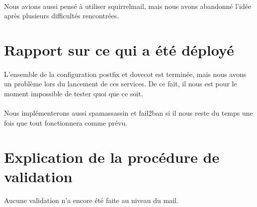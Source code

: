 \documentclass[a4paper,12pt]{article}
\begin{document}
	\paragraph{} Nous avions aussi pensé à utiliser squirrelmail, mais nous avons abandonné l'idée après plusieurs difficultés rencontrées.
		
\section{Rapport sur ce qui a été déployé}
	\paragraph{} L'ensemble de la configuration postfix et dovecot est terminée, mais nous avons un problème lors du lancement de ces services. De ce fait, il nous est pour le moment impossible de tester quoi que ce soit. 
	\paragraph{} Nous implémenterons aussi spamassassin et fail2ban si il nous reste du temps une fois que tout fonctionnera comme prévu.
	
\section{Explication de la procédure de validation}
	\paragraph{} Aucune validation n'a encore été faite au niveau du mail.  
\end{document}
